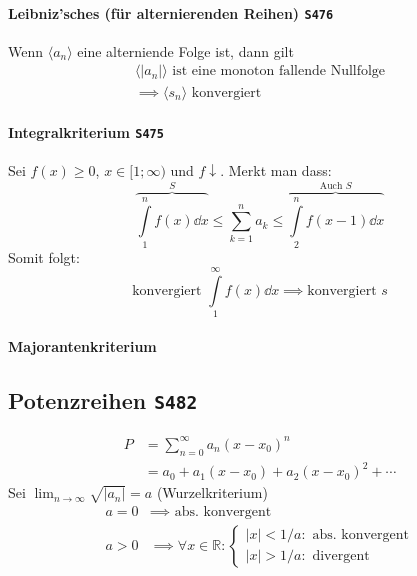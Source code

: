 \documentclass[margin=small, twocolumn]{hsrzf}
\numberwithin{equation}{subsection}
\newcommand{\brpage}[1]{\textcolor{red!70!black}{\small\texttt{S#1}}}
\begin{document}
\paragraph{Leibniz'sches (f\"ur alternierenden Reihen) \brpage{476}}
Wenn \(\langle a_n \rangle\) eine alterniende Folge ist, dann gilt
\begin{gather*}
    \langle |a_n| \rangle \text{ ist eine monoton fallende Nullfolge} \\
    \implies \langle s_n \rangle \text{ konvergiert}
\end{gather*}

\paragraph{Integralkriterium \brpage{475}}
Sei \(f(x) \geq 0\), \(x \in [1;\infty)\) und \(f\downarrow\). Merkt man dass:
\[
    \overbrace{\int\limits_1^n f(x) \dd{x}}^{S} 
    \leq \sum_{k=1}^n a_k
    \leq \overbrace{\int\limits_2^n f(x-1) \dd{x}}^{\text{Auch } S}
\]
Somit folgt:
\[
    \text{konvergiert } \int\limits_1^\infty f(x) \dd{x}
    \implies \text{konvergiert } s
\]

\paragraph{Majorantenkriterium} 

\subsection{Potenzreihen \brpage{482}} \label{sec:powerseries}
\begin{align*}
    P &= \sum_{n=0}^\infty a_n (x - x_0)^n \\
      &= a_0 + a_1 (x - x_0) + a_2 (x - x_0)^2 + \cdots
\end{align*}
Sei \(\lim_{n\to\infty} \sqrt{|a_n|} = a \) (Wurzelkriterium)
\begin{align*}
    a = 0 &\implies \text{ abs. konvergent} \\
    a > 0 &\implies
    \forall x \in \mathbb{R}:
    \begin{cases}
        |x| < 1/a: \text{ abs. konvergent} \\
        |x| > 1/a: \text{ divergent}
    \end{cases}
\end{align*}
\end{document}

